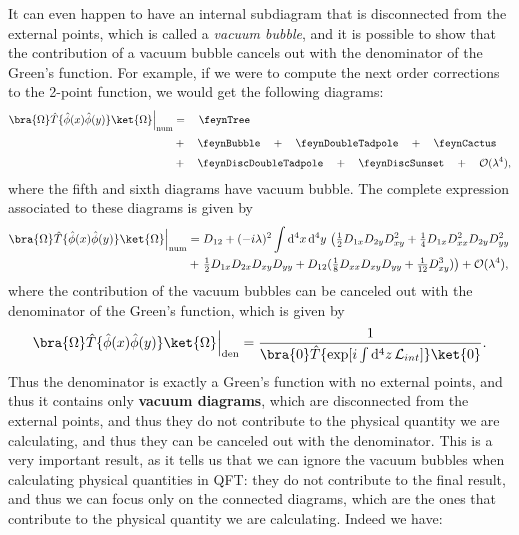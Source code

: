 It can even happen to have an internal subdiagram that is disconnected from the external points, which is called a \textit{vacuum bubble}, and it is possible to show that the contribution of a vacuum bubble cancels out with the denominator of the Green's function. For example, if we were to compute the next order corrections to the 2-point function, we would get the following diagrams:
\[
    \begin{aligned}
        \bra{\Omega} \hat{T} \{ \hat{\phi} (x) \hat{\phi} (y) \} \ket{\Omega} \Big|_{\text{num}}
         & = \quad \feynTree                                                                                  \\[2pt]
         & + \quad \feynBubble \quad + \quad \feynDoubleTadpole \quad + \quad \feynCactus                     \\[2pt]
         & + \quad \feynDiscDoubleTadpole \quad + \quad \feynDiscSunset \quad + \quad \mathcal{O}(\lambda^4),
    \end{aligned}
\]
where the fifth and sixth diagrams have vacuum bubble. The complete expression associated to these diagrams is given by
\[
    \begin{aligned}
        \bra{\Omega} \hat{T} \{ \hat{\phi} (x) \hat{\phi} (y) \} \ket{\Omega} \Big|_{\text{num}} & = D_{12} + (-i \lambda)^2 \int \mathrm{d}^4 x \,\mathrm{d}^4 y \, \left( \tfrac{1}{2} D_{1x} D_{2y} D_{x y}^2 + \tfrac{1}{4} D_{1x} D_{xx}^2 D_{2y} D_{yy}^2\right. \\
                                                                                                 & + \left. \tfrac{1}{2} D_{1x} D_{2x} D_{xy} D_{yy} + D_{12} (\tfrac{1}{8} D_{xx} D_{xy} D_{yy} + \tfrac{1}{12} D_{xy}^3) \right) + \mathcal{O}(\lambda^4),
    \end{aligned}
\]
where the contribution of the vacuum bubbles can be canceled out with the denominator of the Green's function, which is given by
\[
    \bra{\Omega} \hat{T} \{ \hat{\phi} (x) \hat{\phi} (y) \} \ket{\Omega} \Big|_{\text{den}} = \frac{1}{\bra{0} \hat{T} \{ \exp[ i \int \mathrm{d}^4 z \, \mathcal{L}_{int} ] \} \ket{0}}.
\]
Thus the denominator is exactly a Green's function with no external points, and thus it contains only \textbf{vacuum diagrams}, which are disconnected from the external points, and thus they do not contribute to the physical quantity we are calculating, and thus they can be canceled out with the denominator. This is a very important result, as it tells us that we can ignore the vacuum bubbles when calculating physical quantities in QFT: they do not contribute to the final result, and thus we can focus only on the connected diagrams, which are the ones that contribute to the physical quantity we are calculating. Indeed we have:
